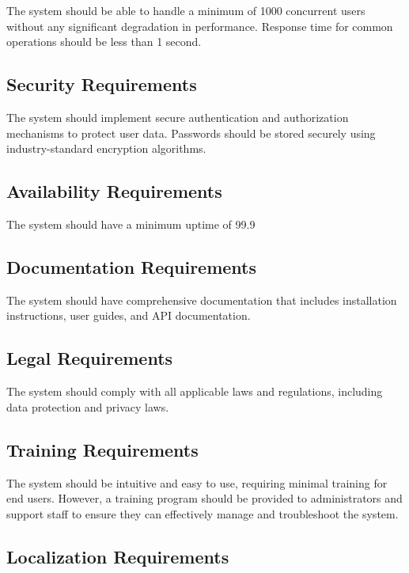 The system should be able to handle a minimum of 1000 concurrent users without any significant degradation in performance. Response time for common operations should be less than 1 second.

\subsection{Security Requirements}

The system should implement secure authentication and authorization mechanisms to protect user data. Passwords should be stored securely using industry-standard encryption algorithms.

\subsection{Availability Requirements}

The system should have a minimum uptime of 99.9%

\subsection{Documentation Requirements}

The system should have comprehensive documentation that includes installation instructions, user guides, and API documentation.

\subsection{Legal Requirements}

The system should comply with all applicable laws and regulations, including data protection and privacy laws.

\subsection{Training Requirements}

The system should be intuitive and easy to use, requiring minimal training for end users. However, a training program should be provided to administrators and support staff to ensure they can effectively manage and troubleshoot the system.

\subsection{Localization Requirements}

